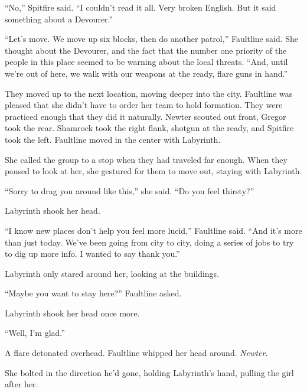 ``No,'' Spitfire said.  ``I couldn't read it all.  Very broken English.  But it said something about a Devourer.''



``Let's move.  We move up six blocks, then do another patrol,'' Faultline said.  She thought about the Devourer, and the fact that the number one priority of the people in this place seemed to be warning about the local threats.  ``And, until we're out of here, we walk with our weapons at the ready, flare guns in hand.''



They moved up to the next location, moving deeper into the city.  Faultline was pleased that she didn't have to order her team to hold formation.  They were practiced enough that they did it naturally.  Newter scouted out front, Gregor took the rear.  Shamrock took the right flank, shotgun at the ready, and Spitfire took the left.  Faultline moved in the center with Labyrinth.



She called the group to a stop when they had traveled far enough.  When they paused to look at her, she gestured for them to move out, staying with Labyrinth.



``Sorry to drag you around like this,'' she said.  ``Do you feel thirsty?''



Labyrinth shook her head.



``I know new places don't help you feel more lucid,'' Faultline said.  ``And it's more than just today.  We've been going from city to city, doing a series of jobs to try to dig up more info.  I wanted to say thank you.''



Labyrinth only stared around her, looking at the buildings.



``Maybe you want to stay here?'' Faultline asked.



Labyrinth shook her head once more.



``Well, I'm glad.''



A flare detonated overhead.  Faultline whipped her head around.  \emph{Newter}.



She bolted in the direction he'd gone, holding Labyrinth's hand, pulling the girl after her.



